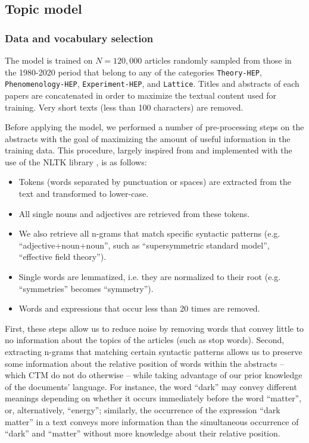 \documentclass[smallextended]{svjour3}
\begin{document}

\subsection{Topic model}


\subsubsection{\label{appendix:data_selection}Data and vocabulary selection}

The model is trained on $N=120,000$ articles randomly sampled from those in the 1980-2020 period that belong to any of the categories \texttt{Theory-HEP}, \texttt{Phenomenology-HEP}, \texttt{Experiment-HEP}, and \texttt{Lattice}. Titles and abstracts of each papers are concatenated in order to maximize the textual content used for training. Very short texts (less than 100 characters) are removed.

Before applying the model, we performed a number of pre-processing steps on the abstracts with the goal of maximizing the amount of useful information in the training data. This procedure, largely inspired from \citealt{omodei_tel-01097702} and implemented with the use of the NLTK library \citep{nltk}, is as follows:

\begin{itemize}
    \item Tokens (words separated by punctuation or spaces) are extracted from the text and transformed to lower-case.
    \item All single nouns and adjectives are retrieved from these tokens.
    \item We also retrieve all n-grams that match specific syntactic patterns (e.g. ``adjective+noun+noun'', such as ``supersymmetric standard model'', ``effective field theory'').
    \item Single words are lemmatized, i.e. they are normalized to their root (e.g. ``symmetries'' becomes ``symmetry'').
    \item Words and expressions that occur less than 20 times are removed.
\end{itemize}

First, these steps allow us to reduce noise by removing words that convey little to no information about the topics of the articles (such as stop words). Second, extracting n-grams that matching certain syntactic patterns allows us to preserve some information about the relative position of words within the abstracts -- which CTM do not do otherwise -- while taking advantage of our prior knowledge of the documents' language. For instance, the word ``dark'' may convey different meanings depending on whether it occurs immediately before the word ``matter'', or, alternatively, ``energy''; similarly, the occurrence of the expression ``dark matter'' in a text conveys more information than the simultaneous occurrence of ``dark'' and ``matter'' without more knowledge about their relative position.
\end{document}
